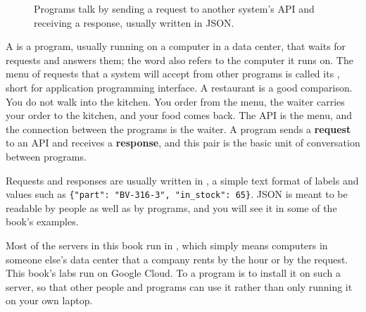 \begin{figure}[htbp]
\centering
{}
\caption{Programs talk by sending a request to another system's API and receiving a response, usually written in JSON.}
\label{fig:api}
\end{figure}

A  is a program, usually running on a computer in a data center, that waits for requests and answers them; the word also refers to the computer it runs on. The menu of requests that a system will accept from other programs is called its , short for application programming interface. A restaurant is a good comparison. You do not walk into the kitchen. You order from the menu, the waiter carries your order to the kitchen, and your food comes back. The API is the menu, and the connection between the programs is the waiter. A program sends a \textbf{request} to an API and receives a \textbf{response}, and this pair is the basic unit of conversation between programs.

Requests and responses are usually written in , a simple text format of labels and values such as \texttt{\{"part": "BV-316-3", "in\_stock": 65\}}. JSON is meant to be readable by people as well as by programs, and you will see it in some of the book's examples.

Most of the servers in this book run in , which simply means computers in someone else's data center that a company rents by the hour or by the request. This book's labs run on Google Cloud. To  a program is to install it on such a server, so that other people and programs can use it rather than only running it on your own laptop.

